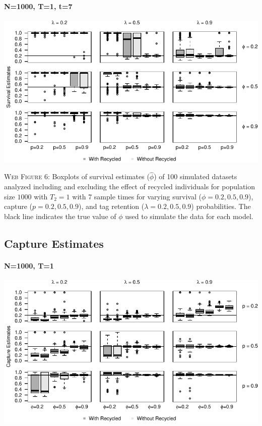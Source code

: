 \documentclass[]{article}
\let\oldparagraph\paragraph
\renewcommand{\paragraph}[1]{\oldparagraph{#1}\mbox{}}
\begin{document}
\paragraph{N=1000, T=1, t=7}\label{n1000-t1-t7}

\includegraphics{Appendix_BW_files/figure-latex/figure6_survival_GJSTL6-1.pdf}

\textsc{Web Figure 6:} Boxplots of survival estimates (\(\hat{\phi}\))
of 100 simulated datasets analyzed including and excluding the effect of
recycled individuals for population size \(1000\) with \(T_2=1\) with 7
sample times for varying survival (\(\phi=0.2,0.5,0.9\)), capture
(\(p=0.2,0.5,0.9\)), and tag retention (\(\lambda=0.2,0.5,0.9\))
probabilities. The black line indicates the true value of \(\phi\) used
to simulate the data for each model.

\newpage

\subsection{Capture Estimates}\label{capture-estimates}

\paragraph{N=1000, T=1}\label{n1000-t1-1}

\includegraphics{Appendix_BW_files/figure-latex/figure7_capture_GJSTL1-1.pdf}
\end{document}

